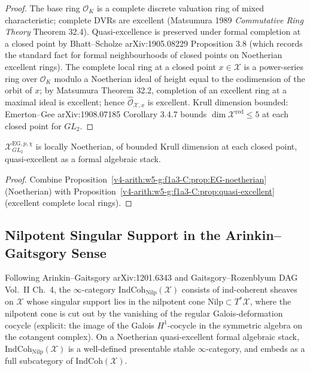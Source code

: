 \begin{proof}
The base ring \(\mathcal{O}_{K}\) is a complete discrete valuation ring
of mixed characteristic; complete DVRs are excellent (Matsumura 1989
\emph{Commutative Ring Theory} Theorem 32.4). Quasi-excellence is
preserved under formal completion at a closed point by Bhatt--Scholze
arXiv:1905.08229 Proposition 3.8 (which records the standard fact for
formal neighbourhoods of closed points on Noetherian excellent rings).
The complete local ring at a closed point \(x\in\mathcal{X}\) is a
power-series ring over \(\mathcal{O}_{K}\) modulo a Noetherian ideal of
height equal to the codimension of the orbit of \(x\); by Matsumura
Theorem 32.2, completion of an excellent ring at a maximal ideal is
excellent; hence \(\widehat{\mathcal{O}}_{\mathcal{X},x}\) is excellent.
Krull dimension bounded: Emerton--Gee arXiv:1908.07185 Corollary 3.4.7
bounds \(\dim\mathcal{X}^{\mathrm{red}}\leq 5\) at each closed point
for \(GL_{2}\).
\end{proof}

\begin{corollary}
\label{v4-arith:w5-g:f1a3-C:cor:locally-noetherian-finite-dim}
\(\mathcal{X}^{\mathrm{EG},p,\chi}_{GL_{2}}\) is
locally Noetherian, of bounded Krull dimension at each closed point,
quasi-excellent as a formal algebraic stack.
\end{corollary}

\begin{proof}
Combine Proposition~\ref{v4-arith:w5-g:f1a3-C:prop:EG-noetherian} (Noetherian)
with Proposition~\ref{v4-arith:w5-g:f1a3-C:prop:quasi-excellent} (excellent
complete local rings).
\end{proof}

\subsection{Nilpotent Singular Support in the Arinkin--Gaitsgory Sense}

\begin{definition}
\label{v4-arith:w5-g:f1a3-C:def:IndCoh-Nilp}
Following Arinkin--Gaitsgory arXiv:1201.6343
and Gaitsgory--Rozenblyum DAG Vol.~II Ch.~4, the
\(\infty\)-category \(\mathrm{IndCoh}_{\mathrm{Nilp}}(\mathcal{X})\)
consists of ind-coherent sheaves on \(\mathcal{X}\) whose singular
support lies in the nilpotent cone
\(\mathrm{Nilp}\subset T^{*}\mathcal{X}\), where the nilpotent cone is
cut out by the vanishing of the regular Galois-deformation cocycle
(explicit: the image of the Galois \(H^{1}\)-cocycle in the symmetric
algebra on the cotangent complex). On a Noetherian quasi-excellent
formal algebraic stack, \(\mathrm{IndCoh}_{\mathrm{Nilp}}(\mathcal{X})\)
is a well-defined presentable stable \(\infty\)-category, and embeds as
a full subcategory of \(\mathrm{IndCoh}(\mathcal{X})\).
\end{definition}

